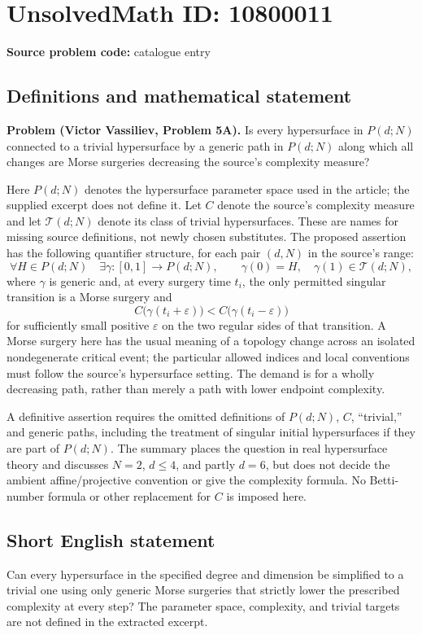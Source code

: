 \documentclass[11pt]{article}
\newcommand{\eps}{\varepsilon}
\begin{document}
\section*{UnsolvedMath ID: 10800011}
\textbf{Source problem code:} catalogue entry
\subsection{Definitions and mathematical statement}
\textbf{Problem (Victor Vassiliev, Problem 5A).} Is every hypersurface in $P(d;N)$ connected to a trivial hypersurface by a generic path in $P(d;N)$ along which all changes are Morse surgeries decreasing the source's complexity measure?

Here $P(d;N)$ denotes the hypersurface parameter space used in the article; the supplied excerpt does not define it. Let $C$ denote the source's complexity measure and let $\mathcal T(d;N)$ denote its class of trivial hypersurfaces. These are names for missing source definitions, not newly chosen substitutes. The proposed assertion has the following quantifier structure, for each pair $(d,N)$ in the source's range:
\[
 \forall H\in P(d;N)\quad \exists\gamma:[0,1]\longrightarrow P(d;N),\qquad
 \gamma(0)=H,\quad\gamma(1)\in\mathcal T(d;N),
\]
where $\gamma$ is generic and, at every surgery time $t_i$, the only permitted singular transition is a Morse surgery and
\[
 C\bigl(\gamma(t_i+\eps)\bigr)<C\bigl(\gamma(t_i-\eps)\bigr)
\]
for sufficiently small positive $\eps$ on the two regular sides of that transition. A Morse surgery here has the usual meaning of a topology change across an isolated nondegenerate critical event; the particular allowed indices and local conventions must follow the source's hypersurface setting. The demand is for a wholly decreasing path, rather than merely a path with lower endpoint complexity.

A definitive assertion requires the omitted definitions of $P(d;N)$, $C$, ``trivial,'' and generic paths, including the treatment of singular initial hypersurfaces if they are part of $P(d;N)$. The summary places the question in real hypersurface theory and discusses $N=2$, $d\le4$, and partly $d=6$, but does not decide the ambient affine/projective convention or give the complexity formula. No Betti-number formula or other replacement for $C$ is imposed here.
\subsection{Short English statement}
Can every hypersurface in the specified degree and dimension be simplified to a trivial one using only generic Morse surgeries that strictly lower the prescribed complexity at every step? The parameter space, complexity, and trivial targets are not defined in the extracted excerpt.
\end{document}
